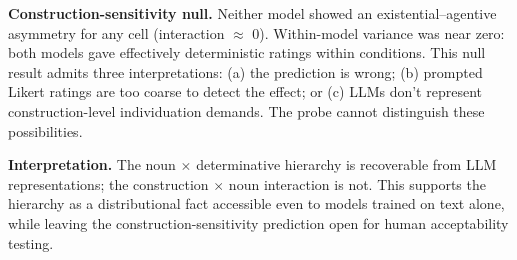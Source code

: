 \documentclass[12pt,a4paper]{article}
\begin{document}
\textbf{Construction-sensitivity null.} Neither model showed an existential--agentive asymmetry for any cell (interaction $\approx$ 0). Within-model variance was near zero: both models gave effectively deterministic ratings within conditions. This null result admits three interpretations: (a) the prediction is wrong; (b) prompted Likert ratings are too coarse to detect the effect; or (c) LLMs don't represent construction-level individuation demands. The probe cannot distinguish these possibilities.

\textbf{Interpretation.} The noun $\times$ determinative hierarchy is recoverable from LLM representations; the construction $\times$ noun interaction is not. This supports the hierarchy as a distributional fact accessible even to models trained on text alone, while leaving the construction-sensitivity prediction open for human acceptability testing.
\end{document}
